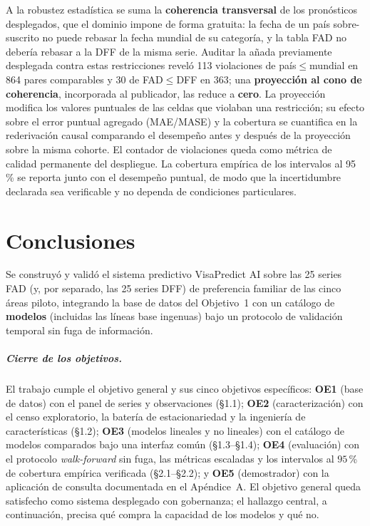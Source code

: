 \documentclass[12pt,letterpaper]{report}
\begin{document}
A la robustez estadística se suma la \textbf{coherencia transversal} de los pronósticos
desplegados, que el dominio impone de forma gratuita: la fecha de un país
sobre-suscrito no puede rebasar la fecha mundial de su categoría, y la tabla FAD no
debería rebasar a la DFF de la misma serie. Auditar la añada previamente desplegada
contra estas restricciones reveló 113 violaciones de país$\leq$mundial en 864 pares
comparables y 30 de FAD$\leq$DFF en 363; una \textbf{proyección al cono de coherencia},
incorporada al publicador, las reduce a \textbf{cero}. La proyección modifica los valores
puntuales de las celdas que violaban una restricción; su efecto sobre el error puntual
agregado (MAE/MASE) y la cobertura se cuantifica en la rederivación causal comparando el
desempeño antes y después de la proyección sobre la misma cohorte. El contador de
violaciones queda como métrica de calidad permanente del despliegue. La
cobertura empírica de los intervalos al 95\,\% se reporta junto con el desempeño puntual,
de modo que la incertidumbre declarada sea verificable y no dependa de condiciones
particulares.

\chapter{Conclusiones}

Se construyó y validó el sistema predictivo VisaPredict AI sobre las 25 series FAD (y,
por separado, las 25 series DFF) de preferencia familiar de las cinco áreas piloto,
integrando la base de datos del Objetivo~1 con un catálogo de \textbf{\factNModels{} modelos}
(incluidas las líneas base ingenuas) bajo un protocolo de validación temporal sin fuga de
información.

\paragraph{Cierre de los objetivos.} El trabajo cumple el objetivo general y sus cinco
objetivos específicos: \textbf{OE1} (base de datos) con el panel de \factNSeriesStructural{}
series y \factNObsFmt{} observaciones (§1.1); \textbf{OE2} (caracterización) con el censo
exploratorio, la batería de estacionariedad y la ingeniería de características (§1.2);
\textbf{OE3} (modelos lineales y no lineales) con el catálogo de \factNModels{} modelos
comparados bajo una interfaz común (§1.3--§1.4); \textbf{OE4} (evaluación) con el protocolo
\textit{walk-forward} sin fuga, las métricas escaladas y los intervalos al $95$\,\% de
cobertura empírica verificada (§2.1--§2.2); y \textbf{OE5} (demostrador) con la aplicación de
consulta documentada en el Apéndice~A. El objetivo general queda satisfecho como sistema
desplegado con gobernanza; el hallazgo central, a continuación, precisa qué compra la
capacidad de los modelos y qué no.
\end{document}
